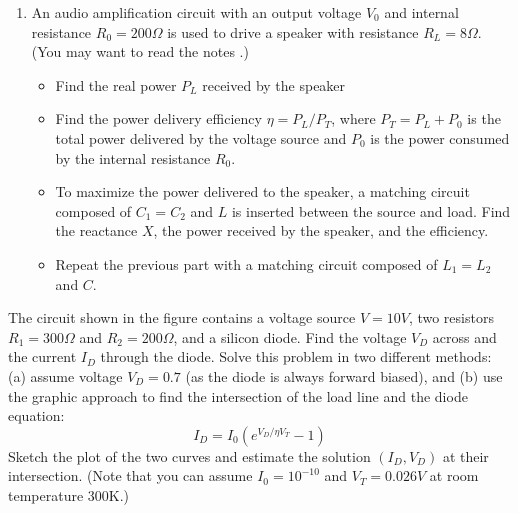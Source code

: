 \begin{enumerate}
\item An audio amplification circuit with an output voltage $V_0$ and internal
  resistance $R_0=200\Omega$ is used to drive a speaker with resistance 
  $R_L=8\Omega$. (You may want to read the notes 
  .)
  \begin{itemize}
  \item Find the real power $P_L$ received by the speaker
  \item Find the power delivery efficiency $\eta=P_L/P_T$, where
    $P_T=P_L+P_0$ is the total power delivered by the voltage source
    and $P_0$ is the power consumed by the internal resistance $R_0$.
  \item To maximize the power delivered to the speaker, a matching circuit
    composed of $C_1=C_2$ and $L$ is inserted between the source and load.
    Find the reactance $X$, the power received by the speaker, and the
    efficiency.
  \item Repeat the previous part with a matching circuit composed of
    $L_1=L_2$ and $C$.
  \end{itemize}

\end{enumerate}



\item The circuit shown in the figure contains a voltage source $V=10V$,
two resistors $R_1=300\Omega$ and $R_2=200\Omega$, and a silicon diode.
Find the voltage $V_D$ across and the current $I_D$ through the diode.
Solve this problem in two different methods: (a) assume voltage $V_D=0.7$ 
(as the diode is always forward biased), and (b) use the graphic approach
to find the intersection of the load line and the diode equation:
\[ I_D=I_0 ( e^{V_D/\eta V_T}-1 ) \]
Sketch the plot of the two curves and estimate the solution $(I_D,V_D)$
at their intersection. (Note that you can assume $I_0=10^{-10}$ and 
$V_T=0.026V$ at room temperature 300K.)



